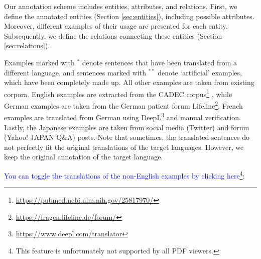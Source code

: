 \documentclass[12pt]{article}
\theoremstyle{definition}
\newcommand{\translated}{$^{\ast}$\xspace}
\newcommand{\madeup}{$^{\ast\ast}$\xspace}
\begin{document}
Our annotation scheme includes entities, attributes, and relations. First, we define the annotated entities (Section \ref{sec:entities}), including possible attributes. Moreover, different examples of their usage are presented for each entity. 
Subsequently, we define the relations connecting these entities (Section \ref{sec:relations}).

Examples marked with \translated denote sentences that have been translated from a different language, and sentences marked with \madeup denote `artificial' examples, which have been completely made up. All other examples are taken from existing corpora.
English examples are extracted from the \textsc{CADEC} corpus\footnote{\url{https://pubmed.ncbi.nlm.nih.gov/25817970/}} \citep{karimi_cadec_2015}, while German examples are taken from the German patient forum Lifeline\footnote{\url{https://fragen.lifeline.de/forum/}}.
French examples are translated from German using DeepL\footnote{\url{https://www.deepl.com/translator}} and manual verification.
Lastly, the Japanese examples are taken from social media (Twitter) and forum (Yahoo! JAPAN Q\&A) posts.
Note that sometimes, the translated sentences do not perfectly fit the original translations of the target languages. 
However, we keep the original annotation of the target language.

\begin{center}
\textcolor{blue}{You can toggle the translations of the non-English examples by clicking here\footnote{This feature is unfortunately not supported by all PDF viewers.}:}    
\end{center}

\begin{center}
\begin{tcolorbox}[hbox]
\end{tcolorbox}
\end{center}
\end{document}

